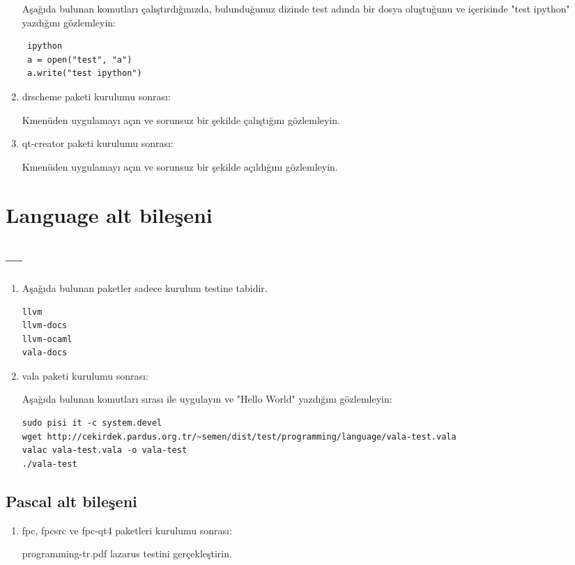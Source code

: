 \documentclass[a4paper,10pt]{article}
\begin{document}
\begin{enumerate}
Aşağıda bulunan komutları çalıştırdığınızda, bulunduğunuz dizinde test adında bir dosya oluştuğunu ve içerisinde "test ipython" yazdığını gözlemleyin:
\begin{verbatim}
 ipython
 a = open("test", "a")
 a.write("test ipython")
\end{verbatim}

\item drscheme paketi kurulumu sonrası:

Kmenüden uygulamayı açın ve sorunsuz bir şekilde çalıştığını gözlemleyin.

\item qt-creator paketi kurulumu sonrası:

Kmenüden uygulamayı açın ve sorunsuz bir şekilde açıldığını gözlemleyin.
\end{enumerate}


\section{Language alt bileşeni}

\subsection{---}
\begin{enumerate}
\item Aşağıda bulunan paketler sadece kurulum testine tabidir.

\begin{verbatim}
llvm
llvm-docs
llvm-ocaml
vala-docs
\end{verbatim}

\item vala paketi kurulumu sonrası:

Aşağıda bulunan komutları sırası ile uygulayın ve "Hello World" yazdığını gözlemleyin:  

\begin{verbatim}
sudo pisi it -c system.devel
wget http://cekirdek.pardus.org.tr/~semen/dist/test/programming/language/vala-test.vala
valac vala-test.vala -o vala-test
./vala-test
\end{verbatim}

 
\end{enumerate}

\subsection{Pascal alt bileşeni}

\begin{enumerate}
 \item fpc, fpcsrc ve fpc-qt4 paketleri kurulumu sonrası:

programming-tr.pdf lazarus testini gerçekleştirin.
\end{enumerate}
\end{document}
